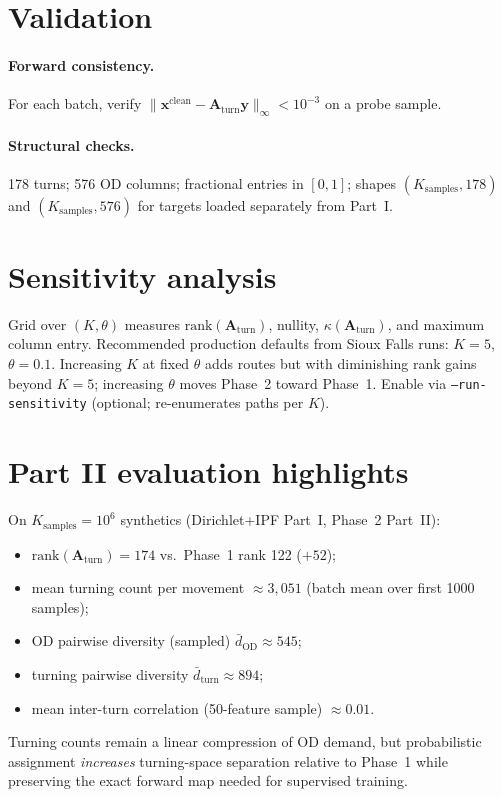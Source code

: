 \documentclass[11pt,a4paper]{report}
\newcommand{\mathbfy}{\mathbf{y}}
\newcommand{\mathbfx}{\mathbf{x}}
\newcommand{\Aturn}{\mathbf{A}_{\mathrm{turn}}}
\begin{document}
\section{Validation}

\paragraph{Forward consistency.}
For each batch, verify $\|\mathbfx^{\mathrm{clean}}-\Aturn\mathbfy\|_\infty<10^{-3}$ on a probe sample.

\paragraph{Structural checks.}
178 turns; 576 OD columns; fractional entries in $[0,1]$; shapes $(K_{\mathrm{samples}},178)$ and $(K_{\mathrm{samples}},576)$ for targets loaded separately from Part~I.

\section{Sensitivity analysis}

Grid over $(K,\theta)$ measures $\mathrm{rank}(\Aturn)$, nullity, $\kappa(\Aturn)$, and maximum column entry. Recommended production defaults from Sioux Falls runs: $K=5$, $\theta=0.1$. Increasing $K$ at fixed $\theta$ adds routes but with diminishing rank gains beyond $K=5$; increasing $\theta$ moves Phase~2 toward Phase~1. Enable via \texttt{--run-sensitivity} (optional; re-enumerates paths per $K$).

\section{Part II evaluation highlights}

On $K_{\mathrm{samples}}=10^6$ synthetics (Dirichlet+IPF Part~I, Phase~2 Part~II):
\begin{itemize}[noitemsep]
    \item $\mathrm{rank}(\Aturn)=174$ vs.\ Phase~1 rank 122 ($+52$);
    \item mean turning count per movement $\approx 3{,}051$ (batch mean over first 1000 samples);
    \item OD pairwise diversity (sampled) $\bar{d}_{\mathrm{OD}}\approx 545$;
    \item turning pairwise diversity $\bar{d}_{\mathrm{turn}}\approx 894$;
    \item mean inter-turn correlation (50-feature sample) $\approx 0.01$.
\end{itemize}
Turning counts remain a linear compression of OD demand, but probabilistic assignment \emph{increases} turning-space separation relative to Phase~1 while preserving the exact forward map needed for supervised training.
\end{document}
